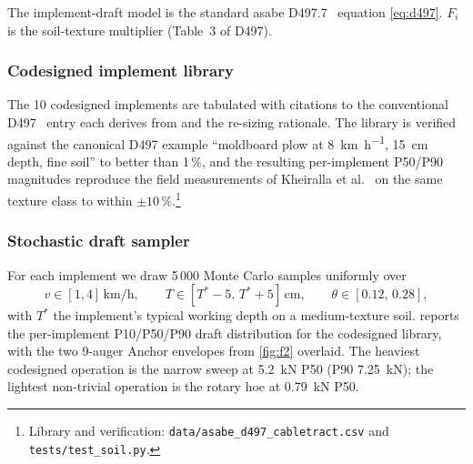 \documentclass[11pt,a4paper]{article}
\begin{document}
The implement-draft model is the standard \gls{asabe} D497.7~\cite{asabe-d497} equation \cref{eq:d497}. $F_{\!i}$ is the soil-texture multiplier (Table~3 of D497).

\subsubsection{Codesigned implement library}\label{sec:soil-codesigned}

The 10 codesigned implements are tabulated with citations to the conventional D497~\cite{asabe-d497} entry each derives from and the re-sizing rationale. The library is verified against the canonical D497 example ``moldboard plow at \SI{8}{\kilo\meter\per\hour}, \SI{15}{\centi\meter} depth, fine soil'' to better than 1\,\%, and the resulting per-implement P50/P90 magnitudes reproduce the field measurements of Kheiralla et al.~\cite{kheiralla2004tillage} on the same texture class to within $\pm 10\,\%$.\footnote{Library and verification: \texttt{data/asabe\_d497\_cabletract.csv} and \texttt{tests/test\_soil.py}.}

\subsubsection{Stochastic draft sampler}\label{sec:soil-monte-carlo}

For each implement we draw 5\,000 Monte Carlo samples uniformly over
\[
v \in [1,4]\,\si{\kilo\meter\per\hour}, \qquad
T \in [T^{*}-5,\, T^{*}+5]\,\si{\centi\meter}, \qquad
\theta \in [0.12,\,0.28],
\]
with $T^{*}$ the implement's typical working depth on a medium-texture soil.  reports the per-implement P10/P50/P90 draft distribution for the codesigned library, with the two 9-auger Anchor envelopes from \cref{fig:f2} overlaid. The heaviest codesigned operation is the narrow sweep at \SI{5.2}{\kilo\newton} P50 (P90 \SI{7.25}{\kilo\newton}); the lightest non-trivial operation is the rotary hoe at \SI{0.79}{\kilo\newton} P50.
\end{document}

